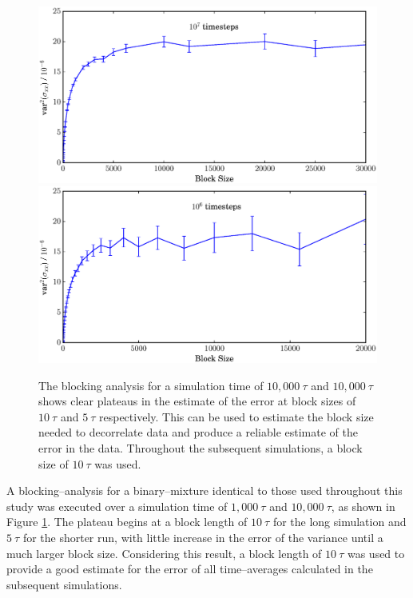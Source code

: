 \begin{figure}[h]
\hspace{-4em}
        \includegraphics[scale=0.35]{block_average_10e6.eps}
        \includegraphics[scale=0.35]{block_average_1e6.eps}
	\caption{The blocking analysis for a simulation time of $10,000\ \tau$ and $10,000\ \tau$ shows clear plateaus in the estimate of the error at block sizes of $10\ \tau$ and $5\ \tau$ respectively.
This can be used to estimate the block size needed to decorrelate data and produce a reliable estimate of the error in the data.
Throughout the subsequent simulations, a block size of $10\ \tau$ was used.}
\label{blocking}
\end{figure}

A blocking--analysis for a binary--mixture identical to those used throughout this study was executed over a simulation time of $1,000\ \tau$ and $10,000\ \tau$, as shown in Figure \ref{blocking}.
The plateau begins at a block length of $10\ \tau$ for the long simulation and $5\ \tau$ for the shorter run, with little increase in the error of the variance until a much larger block size.
Considering this result, a block length of $10\ \tau$ was used to provide a good estimate for the error of all time--averages calculated in the subsequent simulations.
\FloatBarrier

